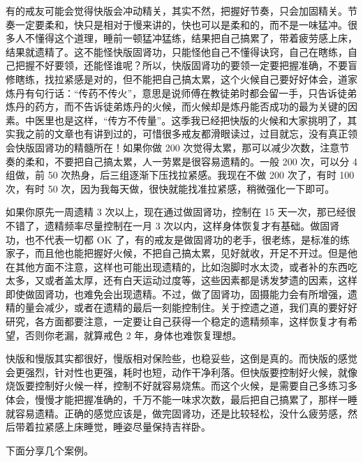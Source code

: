 有的戒友可能会觉得快版会冲动精关，其实不然，把握好节奏，只会加固精关。节奏一定要柔和，快只是相对于慢来讲的，快也可以是柔和的，而不是一味猛冲。很多人不懂得这个道理，睡前一顿猛冲猛练，结果把自己搞累了，带着疲劳感上床，结果就遗精了。这不能怪快版固肾功，只能怪他自己不懂得诀窍，自己在瞎练，自己把握不好要领，还能怪谁呢？所以，快版固肾功的要领一定要把握准确，不要盲修瞎练，找拉紧感是对的，但不能把自己搞太累，这个火候自己要好好体会，道家炼丹有句行话：“传药不传火”，意思是说师傅在教徒弟时都会留一手，只告诉徒弟炼丹的药方，而不告诉徒弟炼丹的火候，而火候却是炼丹能否成功的最为关键的因素。中医里也是这样，“传方不传量”。这季我已经把快版的火候和大家挑明了，其实我之前的文章也有讲到过的，可惜很多戒友都滑眼读过，过目就忘，没有真正领会快版固肾功的精髓所在！如果你做 200 次觉得太累，那可以减少次数，注意节奏的柔和，不要把自己搞太累，人一劳累是很容易遗精的。一般 200 次，可以分 4 组做，前 50 次热身，后三组逐渐下压找拉紧感。我现在不做 200 次了，有时 100 次，有时 50 次，因为我每天做，很快就能找准拉紧感，稍微强化一下即可。

如果你原先一周遗精 3 次以上，现在通过做固肾功，控制在 15 天一次，那已经很不错了，遗精频率尽量控制在一月 3 次以内，这样身体恢复才有基础。做固肾功，也不代表一切都 OK 了，有的戒友是做固肾功的老手，很老练，是标准的练家子，而且他也能把握好火候，不把自己搞太累，见好就收，开足不开过。但是他在其他方面不注意，这样也可能出现遗精的，比如泡脚时水太烫，或者补的东西吃太多，又或者盖太厚，还有白天运动过度等，这些因素都是诱发梦遗的因素，这样即使做固肾功，也难免会出现遗精。不过，做了固肾功，固摄能力会有所增强，遗精的量会减少，或者在遗精的最后一刻能控制住。关于控遗之道，我们真的要好好研究，各方面都要注意，一定要让自己获得一个稳定的遗精频率，这样恢复才有希望，否则你老漏，就算戒色 2 年，身体也难恢复理想。

快版和慢版其实都很好，慢版相对保险些，也稳妥些，这倒是真的。而快版的感觉会更强烈，针对性也更强，耗时也短，动作干净利落。但快版要控制好火候，就像烧饭要控制好火候一样，控制不好就容易烧焦。而这个火候，是需要自己多练习多体会，慢慢才能把握准确的，千万不能一味求次数，最后把自己搞累了，那样一睡就容易遗精。正确的感觉应该是，做完固肾功，还是比较轻松，没什么疲劳感，然后带着拉紧感上床睡觉，睡姿尽量保持吉祥卧。

下面分享几个案例。


